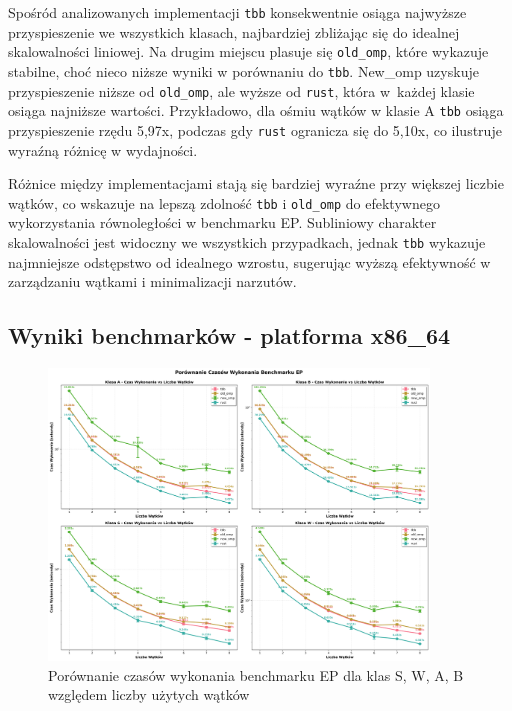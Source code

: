 Spośród analizowanych implementacji \texttt{tbb} konsekwentnie osiąga najwyższe przyspieszenie we wszystkich klasach, najbardziej zbliżając się do idealnej skalowalności liniowej. Na drugim miejscu plasuje się \texttt{old\_omp}, które wykazuje stabilne, choć nieco niższe wyniki w porównaniu do \texttt{tbb}. New\_omp uzyskuje przyspieszenie niższe od \texttt{old\_omp}, ale wyższe od \texttt{rust}, która w~każdej klasie osiąga najniższe wartości. Przykładowo, dla ośmiu wątków w klasie A \texttt{tbb} osiąga przyspieszenie rzędu 5,97x, podczas gdy \texttt{rust} ogranicza się do 5,10x, co ilustruje wyraźną różnicę w wydajności.

Różnice między implementacjami stają się bardziej wyraźne przy większej liczbie wątków, co wskazuje na lepszą zdolność \texttt{tbb} i \texttt{old\_omp} do efektywnego wykorzystania równoległości w benchmarku EP. Subliniowy charakter skalowalności jest widoczny we wszystkich przypadkach, jednak \texttt{tbb} wykazuje najmniejsze odstępstwo od idealnego wzrostu, sugerując wyższą efektywność w zarządzaniu wątkami i minimalizacji narzutów.

\subsection{Wyniki benchmarków - platforma x86\_64}
\begin{figure}[H]
    \centering
    \includegraphics[width=0.9\textwidth]{analiza/images/parallel/ep/x86/ep_porownanie_czasow_wykonania.png}
    \caption{Porównanie czasów wykonania benchmarku EP dla klas S, W, A, B względem liczby użytych wątków}
    \label{ep_porownanie_czasow_wykonania_x86_64}
\end{figure}

